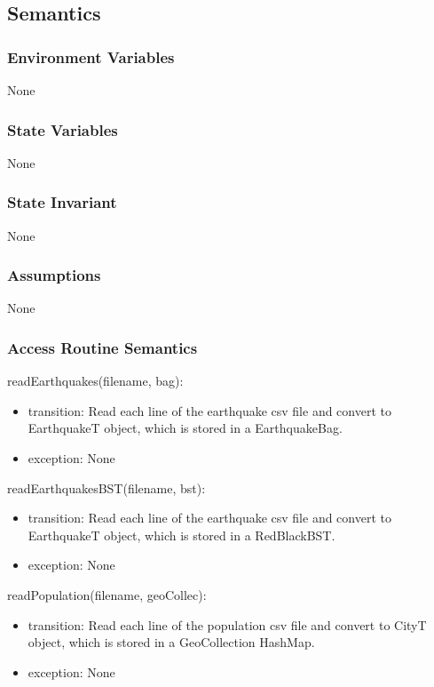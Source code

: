 \documentclass[12pt]{article}
\begin{document}
\subsection* {Semantics}

\subsubsection* {Environment Variables}

None

\subsubsection* {State Variables}

None

\subsubsection* {State Invariant}

None

\subsubsection* {Assumptions}

None

\subsubsection* {Access Routine Semantics}

\noindent readEarthquakes(filename, bag):
\begin{itemize}
\item transition: Read each line of the earthquake csv file and convert to EarthquakeT object, which is stored in a EarthquakeBag.
\item exception: None
\end{itemize}

\noindent readEarthquakesBST(filename, bst):
\begin{itemize}
\item transition: Read each line of the earthquake csv file and convert to EarthquakeT object, which is stored in a RedBlackBST.
\item exception: None
\end{itemize}

\noindent readPopulation(filename, geoCollec):
\begin{itemize}
\item transition: Read each line of the population csv file and convert to CityT object, which is stored in a GeoCollection HashMap.
\item exception: None
\end{itemize}
\end{document}
